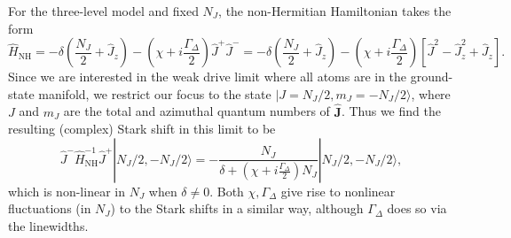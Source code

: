 For the three-level model and fixed $N_J$, the non-Hermitian Hamiltonian takes the form
\begin{subequations}
\begin{equation}
    \hat H_{{{\text{NH}}}} = -\delta \left(\frac{N_J}{2} + \hat J_z\right) - \left(\chi + i \frac{\Gamma_\Delta}{2} \right) \hat J^+ \hat J^- = -\delta \left(\frac{N_J}{2} + \hat J_z\right) - \left(\chi + i \frac{\Gamma_\Delta}{2} \right) \left[ \hat J^2 - \hat J_z^2 + \hat J_z \right].
\end{equation}
\end{subequations}
Since we are interested in the weak drive limit where all atoms are in the ground-state manifold, we restrict our focus to the state $|J = N_J/2, m_J = -N_J /2\rangle$, where $J$ and $m_J$ are the total and azimuthal quantum numbers of $\hat{\mathbf{J}}$. Thus we find the resulting (complex) Stark shift in this limit to be
\begin{equation}
    \hat J^- \hat H_{{\text{NH}}}^{-1} \hat J^+ |N_J/2,-N_J/2 \rangle = -\frac{N_J}{\delta +(\chi + i \frac{\Gamma_\Delta}{2}) N_J} |N_J/2,-N_J/2 \rangle,
\end{equation}
which is non-linear in $N_J$ when $\delta \neq 0$. Both $\chi, \Gamma_\Delta$ give rise to nonlinear fluctuations (in $N_J$) to the Stark shifts in a similar way, although $\Gamma_\Delta$ does so via the linewidths.

